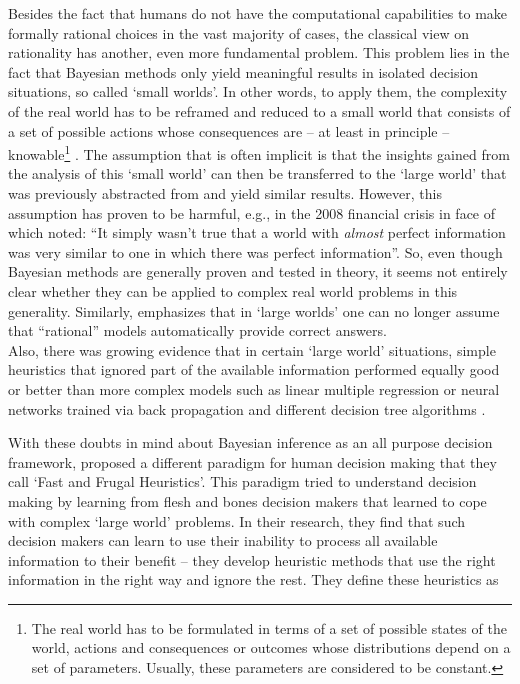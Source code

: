 Besides the fact that humans do not have the computational capabilities to make formally rational choices in the vast majority of cases, the classical view on rationality has another, even more fundamental problem. This problem lies in the fact that Bayesian methods only yield meaningful results in isolated decision situations, so called `small worlds'. In other words, to apply them, the complexity of the real world has to be reframed and reduced to a small world that consists of a set of possible actions whose consequences are -- at least in principle -- knowable\footnote{The real world has to be formulated in terms of a set of possible states of the world, actions and consequences or outcomes whose distributions depend on a set of parameters. Usually, these parameters are considered to be constant.} \citep[for an elaboration see p. 82 ff.][]{savage1972foundations}. The assumption that is often implicit is that the insights gained from the analysis of this `small world' can then be transferred to the `large world' that was previously abstracted from and yield similar results. However, this assumption has proven to be harmful, e.g., in the 2008 financial crisis in face of which \cite{Stiglitz2010} noted: ``It simply wasn't true that a world with \emph{almost} perfect information was very similar to one in which there was perfect information''. So, even though Bayesian methods are generally proven and tested in theory, it seems not entirely clear whether they can be applied to complex real world problems in this generality.
Similarly, \cite{binmore2008rational} emphasizes that in `large worlds' one can no longer assume that ``rational'' models automatically provide correct answers.\\
Also, there was growing evidence that in certain `large world' situations, simple heuristics that ignored part of the available information performed equally good or better than more complex models such as linear multiple regression \citep{Czerlinski1999} or neural networks trained via back propagation and different decision tree algorithms \citep{Chater2003, Brighton2006}.

With these doubts in mind about Bayesian inference as an all purpose decision framework, \cite{Gigerenzer1996} proposed a different paradigm for human decision making that they call `Fast and Frugal Heuristics'. 
This paradigm tried to understand decision making by learning from flesh and bones decision makers that learned to cope with complex `large world' problems. In their research, they find that such decision makers can learn to use their inability to process all available information to their benefit -- they develop heuristic methods that use the right information in the right way and ignore the rest. They define these heuristics as
\\

